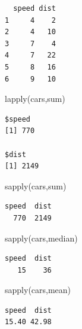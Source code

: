 \documentclass[
  letterpaper,
  DIV=11,
  numbers=noendperiod]{scrreprt}
\newenvironment{Shaded}{\begin{snugshade}}{\end{snugshade}}
\newcommand{\FunctionTok}[1]{\textcolor[rgb]{0.28,0.35,0.67}{#1}}
\newcommand{\NormalTok}[1]{\textcolor[rgb]{0.00,0.23,0.31}{#1}}
\begin{document}
\begin{verbatim}
  speed dist
1     4    2
2     4   10
3     7    4
4     7   22
5     8   16
6     9   10
\end{verbatim}

\begin{Shaded}
\begin{Highlighting}[]
\FunctionTok{lapply}\NormalTok{(cars,sum)}
\end{Highlighting}
\end{Shaded}

\begin{verbatim}
$speed
[1] 770

$dist
[1] 2149
\end{verbatim}

\begin{Shaded}
\begin{Highlighting}[]
\FunctionTok{sapply}\NormalTok{(cars,sum)}
\end{Highlighting}
\end{Shaded}

\begin{verbatim}
speed  dist 
  770  2149 
\end{verbatim}

\begin{Shaded}
\begin{Highlighting}[]
\FunctionTok{sapply}\NormalTok{(cars,median)}
\end{Highlighting}
\end{Shaded}

\begin{verbatim}
speed  dist 
   15    36 
\end{verbatim}

\begin{Shaded}
\begin{Highlighting}[]
\FunctionTok{sapply}\NormalTok{(cars,mean)}
\end{Highlighting}
\end{Shaded}

\begin{verbatim}
speed  dist 
15.40 42.98 
\end{verbatim}
\end{document}
